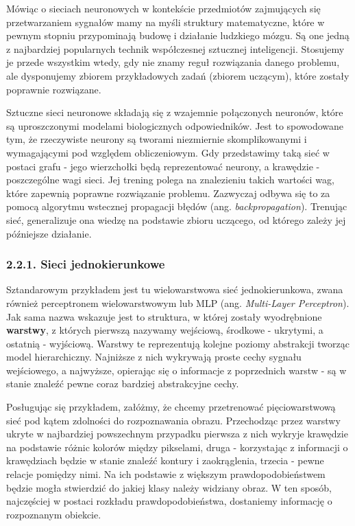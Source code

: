\documentclass{article}
\begin{document}
Mówiąc o sieciach neuronowych w kontekście przedmiotów zajmujących się przetwarzaniem sygnałów mamy na myśli struktury matematyczne, które w pewnym stopniu przypominają budowę i działanie ludzkiego mózgu. Są one jedną z najbardziej popularnych technik współczesnej sztucznej inteligencji. Stosujemy je przede wszystkim wtedy, gdy nie znamy reguł rozwiązania danego problemu, ale dysponujemy zbiorem przykładowych zadań (zbiorem uczącym), które zostały poprawnie rozwiązane. 

Sztuczne sieci neuronowe składają się z wzajemnie połączonych neuronów, które są uproszczonymi modelami biologicznych odpowiedników. Jest to spowodowane tym, że rzeczywiste neurony są tworami niezmiernie skomplikowanymi i wymagającymi pod względem obliczeniowym. Gdy przedstawimy taką sieć w postaci grafu - jego wierzchołki będą reprezentować neurony, a krawędzie - poszczególne wagi sieci. Jej trening polega na znalezieniu takich wartości wag, które zapewnią poprawne rozwiązanie problemu. Zazwyczaj odbywa się to za pomocą algorytmu wstecznej propagacji błędów (ang. \emph{backpropagation}). Trenując sieć, generalizuje ona wiedzę na podstawie zbioru uczącego, od którego zależy jej późniejsze działanie.

\subsubsection*{\Large{2.2.1. Sieci jednokierunkowe}}
Sztandarowym przykładem jest tu wielowarstwowa sieć jednokierunkowa, zwana również perceptronem wielowarstwowym lub MLP (ang. \emph{Multi-Layer Perceptron}). Jak sama nazwa wskazuje jest to struktura, w której zostały wyodrębnione \textbf{warstwy}, z których pierwszą nazywamy wejściową, środkowe - ukrytymi, a ostatnią - wyjściową. Warstwy te reprezentują kolejne poziomy abstrakcji tworząc model hierarchiczny. Najniższe z nich wykrywają proste cechy sygnału wejściowego, a najwyższe, opierając się o informacje z poprzednich warstw - są w stanie znaleźć pewne coraz bardziej abstrakcyjne cechy. 

Posługując się przykładem, załóżmy, że chcemy przetrenować pięciowarstwową sieć pod kątem zdolności do rozpoznawania obrazu. Przechodząc przez warstwy ukryte w najbardziej powszechnym przypadku pierwsza z nich wykryje krawędzie na podstawie różnic kolorów między pikselami, druga - korzystając z informacji o krawędziach będzie w stanie znaleźć kontury i zaokrąglenia, trzecia - pewne relacje pomiędzy nimi. Na ich podstawie z większym prawdopodobieństwem będzie mogła stwierdzić do jakiej klasy należy widziany obraz. W ten sposób, najczęściej w postaci rozkładu prawdopodobieństwa, dostaniemy informację o rozpoznanym obiekcie.
\end{document}
